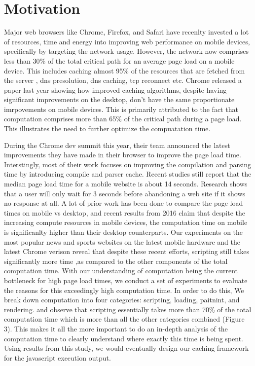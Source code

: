 \section{Motivation}
\label{sec:motivation}


Major web browsers like Chrome, Firefox, and Safari have recenlty invested a lot of resources,
time and energy into improving web performance on mobile devices, specifically by targeting 
the network usage. However, the network now comprises less than 30\% \cite{njait2016www} of the total critical
path for an average page load on a mobile device. This includes caching almost 95\% of the
resources that are fetched from the server \cite{vesuna2016caching}, dns presolution, dns caching, tcp reconnect etc.
Chrome released a paper last year showing how improved caching algorithms, despite having 
significant improvements on the desktop, don't have the same proportionate imrpovements 
on mobile devices. This is primarily attributed to the fact that computation comprises more than 65\%
of the critical path during a page load. This illustrates the need to further optimize the compuatation 
time. 

During the Chrome dev summit this year, their team announced the latest improvements they have 
made in their browser to improve the page load time. Interstingly, most of their work focuses on
improving the compilation and parsing time by introducing compile and parser cache. 
Recent studies \cite{url4} still report that the median page load time for a mobile website 
is about 14 seconds. Research \cite{url4} shows that a user will only wait for 3 seconds 
before abandoning a web site if it shows no response at all. A lot of prior work \cite {njait2016www}
has been done to compare the page load times on mobile vs desktop, and recent results
from 2016 claim that despite the increasing compute resources in mobile devices,
the computation time on mobile is significanlty higher than their desktop counterparts. 
 Our experiments
on the most popular news and sports websites on the latest mobile hardware and the latest 
Chrome verison reveal that despite these recent efforts, scripting still takes significantly more
time ,as compared to the other components of the total computation time. With our understanding of 
computation being the current bottleneck for high page load times, 
we conduct a set of experiments to evaluate the reasons for this
exceedingly high computation time. In order to do this, We break down computation
into four categories: scripting, loading, paitnint, and rendering.
and observe that scripting essentially takes more than 70\% of the total
computation time which is more than all the other categories combined (Figure 3). 
This makes it all the more important to do an in-depth analysis of the computation time to clearly
understand where exactly this time is being spent. Using results from this study, we would eventually
design our caching framework for the javascript execution output. 
